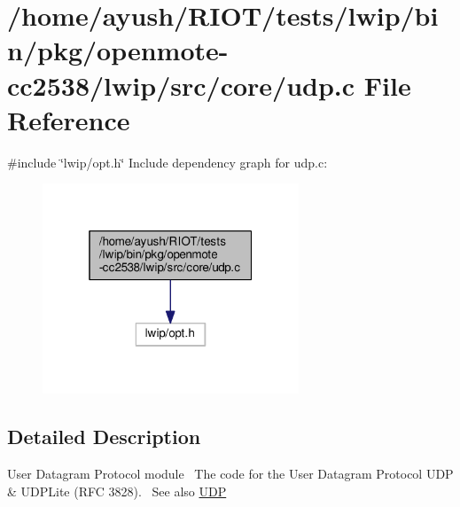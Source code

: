 \hypertarget{lwip_2bin_2pkg_2openmote-cc2538_2lwip_2src_2core_2udp_8c}{}\section{/home/ayush/\+R\+I\+O\+T/tests/lwip/bin/pkg/openmote-\/cc2538/lwip/src/core/udp.c File Reference}
\label{lwip_2bin_2pkg_2openmote-cc2538_2lwip_2src_2core_2udp_8c}
{\ttfamily \#include \char`\"{}lwip/opt.\+h\char`\"{}}\newline
Include dependency graph for udp.\+c\+:
\nopagebreak
\begin{figure}[H]
\begin{center}
\leavevmode
\includegraphics[width=217pt]{lwip_2bin_2pkg_2openmote-cc2538_2lwip_2src_2core_2udp_8c__incl}
\end{center}
\end{figure}


\subsection{Detailed Description}
User Datagram Protocol module~\newline
The code for the User Datagram Protocol U\+DP \& U\+D\+P\+Lite (R\+FC 3828).~\newline
See also \hyperlink{group__udp__raw}{U\+DP} 